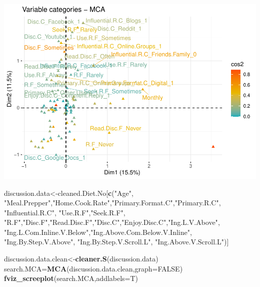 \documentclass[
]{article}
\newenvironment{Shaded}{\begin{snugshade}}{\end{snugshade}}
\newcommand{\DataTypeTok}[1]{\textcolor[rgb]{0.13,0.29,0.53}{#1}}
\newcommand{\KeywordTok}[1]{\textcolor[rgb]{0.13,0.29,0.53}{\textbf{#1}}}
\newcommand{\NormalTok}[1]{#1}
\newcommand{\OtherTok}[1]{\textcolor[rgb]{0.56,0.35,0.01}{#1}}
\newcommand{\StringTok}[1]{\textcolor[rgb]{0.31,0.60,0.02}{#1}}
\begin{document}
\includegraphics{Average-User-MCA_files/figure-latex/diet yes social-3.pdf}

\begin{Shaded}
\begin{Highlighting}[]
\NormalTok{discussion.data<-cleaned.Diet.No[}\KeywordTok{c}\NormalTok{(}\StringTok{"Age"}\NormalTok{, }\StringTok{"Meal.Prepper"}\NormalTok{,}\StringTok{"Home.Cook.Rate"}\NormalTok{,}\StringTok{"Primary.Format.C"}\NormalTok{,}\StringTok{"Primary.R.C"}\NormalTok{, }\StringTok{"Influential.R.C"}\NormalTok{, }
            \StringTok{"Use.R.F"}\NormalTok{,}\StringTok{"Seek.R.F"}\NormalTok{, }\StringTok{"R.F"}\NormalTok{,}\StringTok{"Disc.F"}\NormalTok{,}\StringTok{"Read.Disc.F"}\NormalTok{,}\StringTok{"Disc.C"}\NormalTok{,}\StringTok{"Enjoy.Disc.C"}\NormalTok{,}\StringTok{"Ing.L.V.Above"}\NormalTok{,}
            \StringTok{"Ing.L.Com.Inline.V.Below"}\NormalTok{,}\StringTok{"Ing.Above.Com.Below.V.Inline"}\NormalTok{,  }\StringTok{"Ing.By.Step.V.Above"}\NormalTok{,  }\StringTok{"Ing.By.Step.V.Scroll.L"}\NormalTok{,}
            \StringTok{"Ing.Above.V.Scroll.L"}\NormalTok{)]}

\NormalTok{discussion.data.clean<-}\KeywordTok{cleaner.S}\NormalTok{(discussion.data)}
\NormalTok{search.MCA=}\KeywordTok{MCA}\NormalTok{(discussion.data.clean,}\DataTypeTok{graph=}\OtherTok{FALSE}\NormalTok{)}
\KeywordTok{fviz_screeplot}\NormalTok{(search.MCA,}\DataTypeTok{addlabels=}\NormalTok{T)}
\end{Highlighting}
\end{Shaded}
\end{document}
